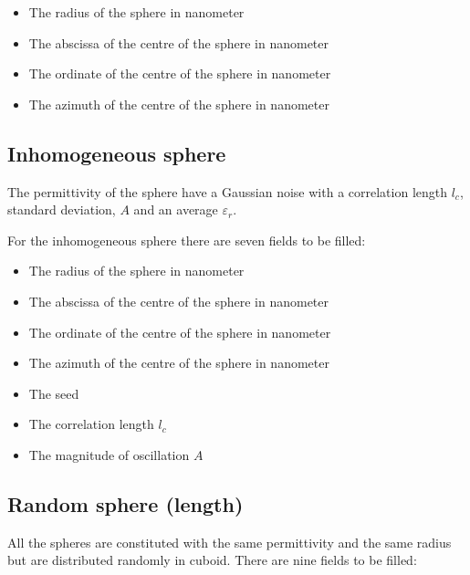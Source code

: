 \begin{itemize}
\item The radius of the sphere in nanometer
\item The abscissa of the centre of the sphere in nanometer
\item The ordinate of the centre of the sphere in nanometer
\item The azimuth of the centre of the sphere in nanometer
\end{itemize}

\subsection{Inhomogeneous sphere }


The permittivity of the sphere have a Gaussian noise with a
correlation length $l_c$, standard deviation, $A$ and an average
$\varepsilon_r$.

For the inhomogeneous sphere there are seven fields to be filled:

\begin{itemize}
\item The radius of the sphere in nanometer
\item The abscissa of the centre of the sphere in nanometer
\item The ordinate of the centre of the sphere in nanometer
\item The azimuth of the centre of the sphere in nanometer
\item The seed
\item The correlation length $l_c$
\item The magnitude of oscillation $A$
\end{itemize}


\subsection{Random sphere (length)}

All the spheres are constituted with the same permittivity and the
same radius but are distributed randomly in cuboid. There are nine
fields to be filled:

